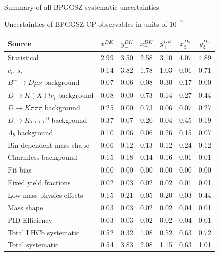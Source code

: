 \documentclass{beamer}
\begin{document}
\begin{frame}{Summary of all BPGGSZ systematic uncertainties}
  \begin{center}
    Uncertainties of BPGGSZ CP observables in units of $10^{-2}$
  \end{center}
  \footnotesize
  \vspace{0.02cm}
  \begin{center}
    \begin{tabular}{lcccccc} 
      \hline
      Source & $x_-^{DK}$ & $y_-^{DK}$ & $x_+^{DK}$ & $y_+^{DK}$ & $x_\xi^{D\pi}$ & $y_\xi^{D\pi}$ \\
      \hline
      Statistical                                   & 2.99  & 3.50  & 2.58  & 3.10  & 4.07  & 4.89  \\
      \hline
      $c_i$, $s_i$                                  & 0.14  & 3.82  & 1.78  & 1.03  & 0.01  & 0.71  \\
      \hline
      $B^\pm\to D\mu\nu$   background               & 0.07  & 0.06  & 0.08  & 0.30  & 0.17  & 0.00  \\
      $D\to K(X)l\nu_l$ background                  & 0.08  & 0.00  & 0.73  & 0.14  & 0.27  & 0.44  \\
      $D\to K\pi\pi\pi$ background                  & 0.25  & 0.00  & 0.73  & 0.06  & 0.07  & 0.27  \\
      $D\to K\pi\pi\pi\pi^0$ background             & 0.37  & 0.07  & 0.20  & 0.04  & 0.45  & 0.19  \\
      $\Lambda_b$ background                        & 0.10  & 0.06  & 0.06  & 0.26  & 0.15  & 0.07  \\
      Bin dependent mass shape                      & 0.06  & 0.12  & 0.13  & 0.12  & 0.24  & 0.12  \\
      Charmless background                          & 0.15  & 0.18  & 0.14  & 0.16  & 0.01  & 0.01  \\
      Fit bias                                      & 0.00  & 0.00  & 0.00  & 0.00  & 0.00  & 0.00  \\
      Fixed yield fractions                         & 0.02  & 0.03  & 0.02  & 0.02  & 0.01  & 0.01  \\
      Low mass physics effects                      & 0.15  & 0.21  & 0.05  & 0.20  & 0.03  & 0.44  \\
      Mass shape                                    & 0.03  & 0.03  & 0.02  & 0.02  & 0.04  & 0.01  \\
      PID Efficiency                                & 0.03  & 0.03  & 0.02  & 0.02  & 0.04  & 0.01  \\
      \hline
      Total LHCb systematic                         & 0.52  & 0.32  & 1.08  & 0.52  & 0.63  & 0.72  \\
      \hline
      Total systematic                              & 0.54  & 3.83  & 2.08  & 1.15  & 0.63  & 1.01  \\
      \hline
    \end{tabular}
  \end{center}
\end{frame}
\end{document}
